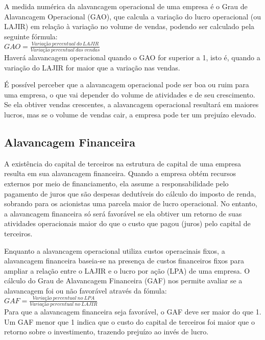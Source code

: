 \documentclass[a4paper,12pt]{article}
\begin{document}
A medida numérica da alavancagem operacional de uma empresa é o Grau de Alavancagem Operacional (GAO), que calcula a variação do lucro operacional (ou LAJIR) em relação à variação no volume de vendas, podendo ser calculado pela seguinte fórmula:\\

$GAO=\frac{Variação \ percentual \ do \ LAJIR}{Variação \ percentual \ das \ vendas}$\\

Haverá alavancagem operacional quando o GAO for superior a 1, isto é, quando a variação do LAJIR for maior que a variação nas vendas.

É possível perceber que a alavancagem operacional pode ser boa ou ruim para uma empresa, o que vai depender do volume de atividades e de seu crescimento. Se ela obtiver vendas crescentes, a alavancagem operacional resultará em maiores lucros, mas se o volume de vendas cair, a empresa pode ter um prejuízo elevado.


\subsection{Alavancagem Financeira}

A existência do capital de terceiros na estrutura de capital de uma empresa resulta em sua alavancagem financeira. Quando a empresa obtém recursos externos por meio de financiamento, ela assume a responsabilidade pelo pagamento de juros que são despesas dedutíveis do cálculo do imposto de renda, sobrando para os acionistas uma parcela maior de lucro operacional. No entanto, a alavancagem financeira só será favorável se ela obtiver um retorno de suas atividades operacionais maior do que o custo que pagou (juros) pelo capital de terceiros.

Enquanto a alavancagem operacional utiliza custos operacinais fixos, a alavancagem financeira baseia-se na presença de custos financeiros fixos para ampliar a relação entre o LAJIR e o lucro por ação (LPA) de uma empresa. O cálculo do Grau de Alavancagem Financeira (GAF) nos permite avaliar se a alavancagem foi ou não favorável através da fómula:\\

$GAF=\frac{Variação \ percentual \ no \ LPA}{Variação \ percentual \ no \ LAJIR}$\\

Para que a alavancagem financeira seja favorável, o GAF deve ser maior do que 1. Um GAF menor que 1 indica que o custo do capital de terceiros foi maior que o retorno sobre o investimento, trazendo prejuízo ao invés de lucro.
\end{document}
